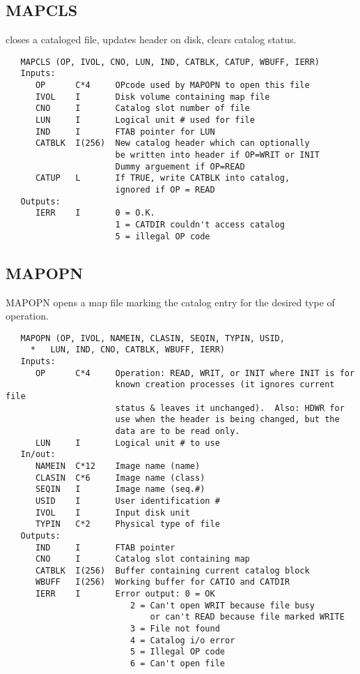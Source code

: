 \subsection{MAPCLS}
closes a cataloged file, updates header on disk, clears catalog
status.
\begin{verbatim}
   MAPCLS (OP, IVOL, CNO, LUN, IND, CATBLK, CATUP, WBUFF, IERR)
   Inputs:
      OP      C*4     OPcode used by MAPOPN to open this file
      IVOL    I       Disk volume containing map file
      CNO     I       Catalog slot number of file
      LUN     I       Logical unit # used for file
      IND     I       FTAB pointer for LUN
      CATBLK  I(256)  New catalog header which can optionally
                      be written into header if OP=WRIT or INIT
                      Dummy arguement if OP=READ
      CATUP   L       If TRUE, write CATBLK into catalog,
                      ignored if OP = READ
   Outputs:
      IERR    I       0 = O.K.
                      1 = CATDIR couldn't access catalog
                      5 = illegal OP code
\end{verbatim}

\subsection{MAPOPN}
MAPOPN opens a map file marking the catalog entry for the desired
type of operation.
\begin{verbatim}
   MAPOPN (OP, IVOL, NAMEIN, CLASIN, SEQIN, TYPIN, USID,
     *   LUN, IND, CNO, CATBLK, WBUFF, IERR)
   Inputs:
      OP      C*4     Operation: READ, WRIT, or INIT where INIT is for
                      known creation processes (it ignores current file
                      status & leaves it unchanged).  Also: HDWR for
                      use when the header is being changed, but the
                      data are to be read only.
      LUN     I       Logical unit # to use
   In/out:
      NAMEIN  C*12    Image name (name)
      CLASIN  C*6     Image name (class)
      SEQIN   I       Image name (seq.#)
      USID    I       User identification #
      IVOL    I       Input disk unit
      TYPIN   C*2     Physical type of file
   Outputs:
      IND     I       FTAB pointer
      CNO     I       Catalog slot containing map
      CATBLK  I(256)  Buffer containing current catalog block
      WBUFF   I(256)  Working buffer for CATIO and CATDIR
      IERR    I       Error output: 0 = OK
                         2 = Can't open WRIT because file busy
                             or can't READ because file marked WRITE
                         3 = File not found
                         4 = Catalog i/o error
                         5 = Illegal OP code
                         6 = Can't open file
\end{verbatim}

